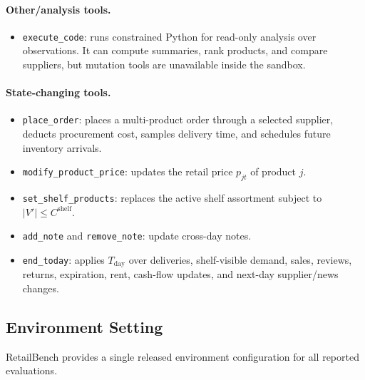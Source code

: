 \paragraph{Other/analysis tools.}
\begin{itemize}[leftmargin=*,nosep]
    \item \texttt{execute\_code}: runs constrained Python for read-only analysis over observations. It can compute summaries, rank products, and compare suppliers, but mutation tools are unavailable inside the sandbox.
\end{itemize}

\paragraph{State-changing tools.}
\begin{itemize}[leftmargin=*,nosep]
    \item \texttt{place\_order}: places a multi-product order through a selected supplier, deducts procurement cost, samples delivery time, and schedules future inventory arrivals.
    \item \texttt{modify\_product\_price}: updates the retail price $p_{jt}$ of product $j$.
    \item \texttt{set\_shelf\_products}: replaces the active shelf assortment subject to $|V'|\le C^{\mathrm{shelf}}$.
    \item \texttt{add\_note} and \texttt{remove\_note}: update cross-day notes.
    \item \texttt{end\_today}: applies $T_{\mathrm{day}}$ over deliveries, shelf-visible demand, sales, reviews, returns, expiration, rent, cash-flow updates, and next-day supplier/news changes.
\end{itemize}

\subsection{Environment Setting}
\label{appendix:env_setting}

RetailBench provides a single released environment configuration for all reported evaluations.

